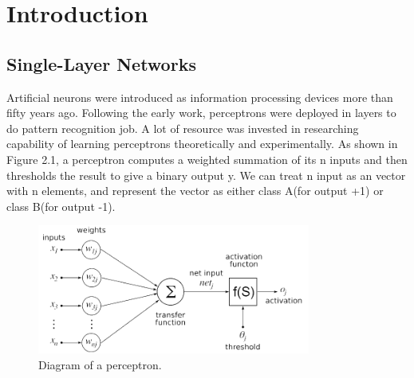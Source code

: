 
\chapter{Introduction} %
\label{Chapter2}


\section{Single-Layer Networks}

Artificial neurons were introduced as information processing devices more than fifty years ago\citep{mcculloch1943logical}. Following the early work, perceptrons were deployed in layers to do pattern recognition job. A lot of resource was invested in researching capability of learning perceptrons theoretically and experimentally. As shown in Figure 2.1, a perceptron computes a weighted summation of its n inputs and then thresholds the result to give a binary output y. We can treat n input as an vector with n elements, and represent the vector as either class A(for output +1) or class B(for output -1).
\graphicspath{ {./Figures/} }
\begin{figure}
\centering
\includegraphics[width=0.8\textwidth]{Figure2-1.png}
\caption{\label{fig:perceptron}Diagram of a perceptron.}
\end{figure}


